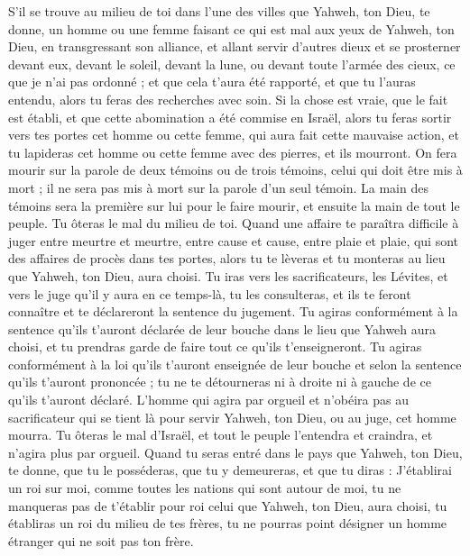 \begin{multicols}{2}
S’il se trouve au milieu de toi dans l’une des villes que Yahweh, ton Dieu, te donne, un homme ou une femme faisant ce qui est mal aux yeux de Yahweh, ton Dieu, en transgressant son alliance,
et allant servir d'autres dieux et se prosterner devant eux, devant le soleil, devant la lune, ou devant toute l'armée des cieux, ce que je n'ai pas ordonné ;
et que cela t'aura été rapporté, et que tu l’auras entendu, alors tu feras des recherches avec soin. Si la chose est vraie, que le fait est établi, et que cette abomination a été commise en Israël,
alors tu feras sortir vers tes portes cet homme ou cette femme, qui aura fait cette mauvaise action, et tu lapideras cet homme ou cette femme avec des pierres, et ils mourront.
On fera mourir sur la parole de deux témoins ou de trois témoins, celui qui doit être mis à mort ; il ne sera pas mis à mort sur la parole d'un seul témoin.
La main des témoins sera la première sur lui pour le faire mourir, et ensuite la main de tout le peuple. Tu ôteras le mal du milieu de toi.
Quand une affaire te paraîtra difficile à juger entre meurtre et meurtre, entre cause et cause, entre plaie et plaie, qui sont des affaires de procès dans tes portes, alors tu te lèveras et tu monteras au lieu que Yahweh, ton Dieu, aura choisi.
Tu iras vers les sacrificateurs, les Lévites, et vers le juge qu’il y aura en ce temps-là, tu les consulteras, et ils te feront connaître et te déclareront la sentence du jugement.
Tu agiras conformément à la sentence qu’ils t’auront déclarée de leur bouche dans le lieu que Yahweh aura choisi, et tu prendras garde de faire tout ce qu'ils t'enseigneront.
Tu agiras conformément à la loi qu'ils t'auront enseignée de leur bouche et selon la sentence qu'ils t'auront prononcée ; tu ne te détourneras ni à droite ni à gauche de ce qu'ils t'auront déclaré.
L'homme qui agira par orgueil et n’obéira pas au sacrificateur qui se tient là pour servir Yahweh, ton Dieu, ou au juge, cet homme mourra. Tu ôteras le mal d'Israël,
et tout le peuple l'entendra et craindra, et n’agira plus par orgueil.
Quand tu seras entré dans le pays que Yahweh, ton Dieu, te donne, que tu le posséderas, que tu y demeureras, et que tu diras : J'établirai un roi sur moi, comme toutes les nations qui sont autour de moi,
tu ne manqueras pas de t'établir pour roi celui que Yahweh, ton Dieu, aura choisi, tu établiras un roi du milieu de tes frères, tu ne pourras point désigner un homme étranger qui ne soit pas ton frère.

\end{multicols}
